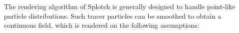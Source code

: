 \documentclass[1p,times]{elsarticle}
\begin{document}
The rendering algorithm of Splotch is generally designed to handle
point-like particle distributions. Such tracer particles can be smoothed
to obtain a continuous field, which is rendered
on the following assumptions:
\end{document}
